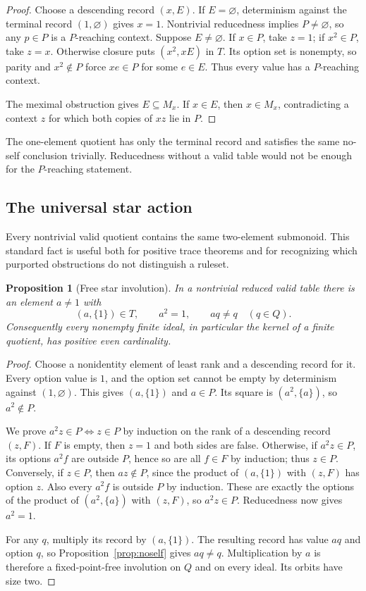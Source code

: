 \documentclass[11pt]{article}
\newtheorem{proposition}[theorem]{Proposition}
\theoremstyle{definition}
\theoremstyle{remark}
\begin{document}
\begin{proof}
Choose a descending record $(x,E)$.  If $E=\varnothing$, determinism against
the terminal record $(1,\varnothing)$ gives $x=1$.  Nontrivial reducedness
implies $P\ne\varnothing$, so any $p\in P$ is a $P$-reaching context.
Suppose $E\ne\varnothing$.  If $x\in P$, take $z=1$; if $x^2\in P$, take
$z=x$.  Otherwise closure puts $(x^2,xE)$ in $T$.  Its option set is
nonempty, so parity and $x^2\notin P$ force $xe\in P$ for some $e\in E$.
Thus every value has a $P$-reaching context.

The meximal obstruction gives $E\subseteq M_x$.  If $x\in E$, then
$x\in M_x$, contradicting a context $z$ for which both copies of $xz$ lie
in $P$.
\end{proof}

The one-element quotient has only the terminal record and satisfies the same
no-self conclusion trivially.  Reducedness without a valid table would not be
enough for the $P$-reaching statement.

\subsection{The universal star action}\label{sec:star}

Every nontrivial valid quotient contains the same two-element submonoid.
This standard fact is useful both for positive trace theorems and for
recognizing which purported obstructions do not distinguish a ruleset.

\begin{proposition}[Free star involution]\label{prop:star}
In a nontrivial reduced valid table there is an element $a\ne1$ with
\[
 (a,\{1\})\in T,\qquad a^2=1,\qquad aq\ne q\quad(q\in Q).
\]
Consequently every nonempty finite ideal, in particular the kernel of a finite
quotient, has positive even cardinality.
\end{proposition}

\begin{proof}
Choose a nonidentity element of least rank and a descending record for it.
Every option value is $1$, and the option set cannot be empty by determinism
against $(1,\varnothing)$.  This gives $(a,\{1\})$ and $a\in P$.
Its square is $(a^2,\{a\})$, so $a^2\notin P$.

We prove $a^2z\in P\Longleftrightarrow z\in P$ by induction on the rank
of a descending record $(z,F)$.  If $F$ is empty, then $z=1$ and both
sides are false.  Otherwise, if $a^2z\in P$, its options $a^2f$ are
outside $P$, hence so are all $f\in F$ by induction; thus $z\in P$.
Conversely, if $z\in P$, then $az\notin P$, since the product of
$(a,\{1\})$ with $(z,F)$ has option $z$.  Also every $a^2f$ is outside
$P$ by induction.  These are exactly the options of the product of
$(a^2,\{a\})$ with $(z,F)$, so $a^2z\in P$.  Reducedness now gives
$a^2=1$.

For any $q$, multiply its record by $(a,\{1\})$.  The resulting record
has value $aq$ and option $q$, so Proposition~\ref{prop:noself} gives
$aq\ne q$.  Multiplication by $a$ is therefore a fixed-point-free
involution on $Q$ and on every ideal.  Its orbits have size two.
\end{proof}
\end{document}
